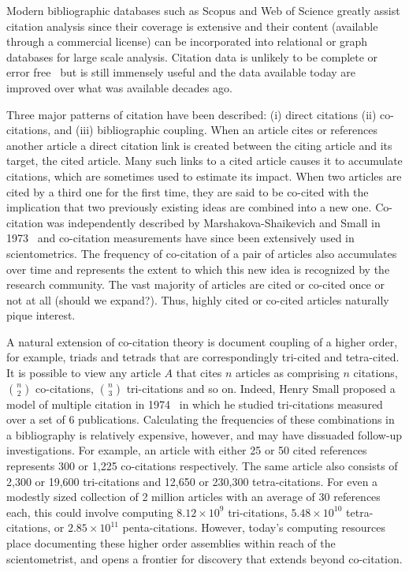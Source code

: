 \documentclass[11pt, oneside]{article}   	%
\begin{document}
Modern bibliographic databases such as Scopus and Web of Science greatly assist citation analysis since their coverage is extensive and their content (available through a commercial license) can be incorporated into relational or graph databases for large scale analysis. Citation data is unlikely to be complete or error free~\citep{macroberts2017} but is still immensely useful and the data available today are improved over what was available decades ago. 

Three major patterns of citation have been described: (i) direct citations (ii) co-citations, and (iii) bibliographic coupling. When an article cites or references another article a direct citation link is created between the citing article and its target, the cited article. Many such links to a cited article causes it to accumulate citations, which are sometimes used to estimate its impact. When two articles are cited by a third one for the first time, they are said to be co-cited with the implication that two previously existing ideas are combined into a new one. Co-citation was independently described by Marshakova-Shaikevich and Small in 1973~\citep{MarshakovaShaikevich1973,Small1973} and co-citation measurements have since been extensively used in scientometrics. The frequency of co-citation of a pair of articles  also accumulates over time and represents the extent to which this new idea is recognized by the research community. The vast majority of articles are cited or co-cited once or not at all (should we expand?). Thus, highly cited or co-cited articles naturally pique interest. 

A natural extension of co-citation theory is document coupling of a higher order, for example, triads and tetrads that are correspondingly tri-cited and tetra-cited. It is possible to view any article $A$ that cites $n$ articles as comprising $n$ citations, $n\choose2$ co-citations, $n\choose3$ tri-citations and so on. Indeed, Henry Small proposed a model of multiple citation in 1974~\citep{small1974multiple} in which he studied tri-citations measured over a set of 6 publications.  Calculating the frequencies of these combinations in a bibliography is relatively expensive, however, and may have dissuaded follow-up investigations. For example, an article with either 25 or 50 cited references represents 300 or 1,225 co-citations respectively. The same article also consists of  2,300 or 19,600 tri-citations and  12,650 or  230,300 tetra-citations. For even a modestly sized collection of 2 million articles with an average of 30 references each, this could involve computing $8.12\times10^9$ tri-citations, $5.48\times10^{10}$ tetra-citations, or $2.85\times10^{11}$ penta-citations. However, today's computing resources place documenting these higher order assemblies within reach of the scientometrist, and opens a frontier for discovery that extends beyond co-citation.
\end{document}
